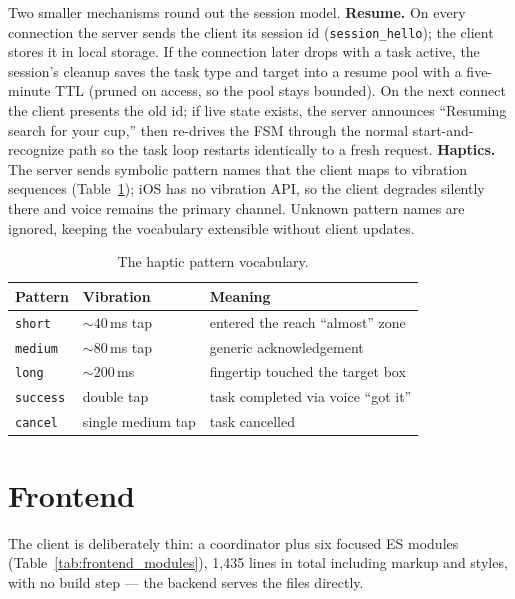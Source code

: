 Two smaller mechanisms round out the session model. \textbf{Resume.} On every
connection the server sends the client its session id (\texttt{session\_hello});
the client stores it in local storage. If the connection later drops with a task
active, the session's cleanup saves the task type and target into a resume pool
with a five-minute TTL (pruned on access, so the pool stays bounded). On the next
connect the client presents the old id; if live state exists, the server announces
``Resuming search for your cup,'' then re-drives the FSM through the normal
start-and-recognize path so the task loop restarts identically to a fresh request.
\textbf{Haptics.} The server sends symbolic pattern names that the client maps to
vibration sequences (Table~\ref{tab:haptics}); iOS has no vibration API, so the
client degrades silently there and voice remains the primary channel. Unknown
pattern names are ignored, keeping the vocabulary extensible without client
updates.

\begin{table}[!htbp]
\centering
\caption[Haptic vocabulary]{The haptic pattern vocabulary.}
\label{tab:haptics}
\small
\begin{tabular}{l l l}
\toprule
\textbf{Pattern} & \textbf{Vibration} & \textbf{Meaning} \\
\midrule
\texttt{short}   & ${\sim}40$\,ms tap    & entered the reach ``almost'' zone \\
\texttt{medium}  & ${\sim}80$\,ms tap    & generic acknowledgement \\
\texttt{long}    & ${\sim}200$\,ms       & fingertip touched the target box \\
\texttt{success} & double tap            & task completed via voice ``got it'' \\
\texttt{cancel}  & single medium tap     & task cancelled \\
\bottomrule
\end{tabular}
\end{table}

\section{Frontend}
\label{sec:frontend}

The client is deliberately thin: a coordinator plus six focused ES modules
(Table~\ref{tab:frontend_modules}), 1{,}435 lines in total including markup and
styles, with no build step --- the backend serves the files directly.

